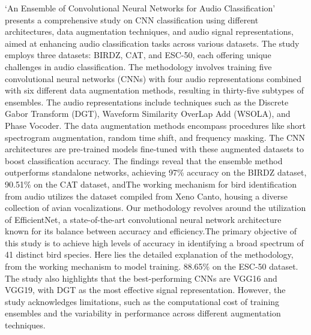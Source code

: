 `An Ensemble of Convolutional Neural Networks for
Audio Classification' \cite{nanni2021ensemble} presents a comprehensive study on CNN classification
using different architectures, data augmentation techniques, and audio signal
representations, aimed at enhancing audio classification tasks across various
datasets. The study employs three datasets: BIRDZ, CAT, and ESC-50, each
offering unique challenges in audio classification. The methodology involves
training five convolutional neural networks (CNNs) with four audio
representations combined with six different data augmentation methods,
resulting in thirty-five subtypes of ensembles. The audio representations
include techniques such as the Discrete Gabor Transform (DGT), Waveform
Similarity OverLap Add (WSOLA), and Phase Vocoder. The data augmentation
methods encompass procedures like short spectrogram augmentation, random time
shift, and frequency masking. The CNN architectures are pre-trained models
fine-tuned with these augmented datasets to boost classification accuracy. The
findings reveal that the ensemble method outperforms standalone networks,
achieving 97\% accuracy on the BIRDZ dataset, 90.51\% on the CAT dataset,
andThe working mechanism for bird identification from audio utilizes the
dataset compiled from Xeno Canto, housing a diverse collection of avian
vocalizations. Our methodology revolves around the utilization of EfficientNet,
a state-of-the-art convolutional neural network architecture known for its
balance between accuracy and efficiency.The primary objective of this study is to achieve high levels of accuracy in
identifying a broad spectrum of 41 distinct bird species. Here lies the
detailed explanation of the methodology, from the working mechanism to model
training. 88.65\% on the ESC-50 dataset. The study also highlights that the
best-performing CNNs are VGG16 and VGG19, with DGT as the most effective signal
representation. However, the study acknowledges limitations, such as the
computational cost of training ensembles and the variability in performance
across different augmentation techniques.\\

